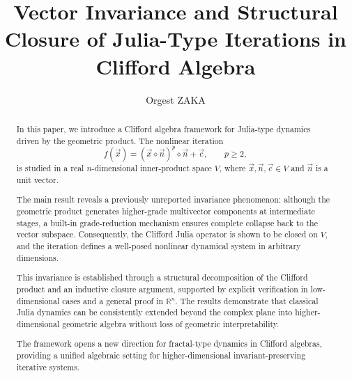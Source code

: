 \documentclass{amsart}
\theoremstyle{plain}
\numberwithin{equation}{section}
\begin{document}
\title[Clifford Julia Dynamics]
{Vector Invariance and Structural Closure of Julia-Type Iterations in Clifford Algebra}
\author{Orgest ZAKA}
\address{Department of Mathematics-Informatics, \\
Faculty of Economy and Agribusiness,\\
Agricultural University of Tirana, \\ Albania.\\
ORCID:  https://orcid.org/0000-0001-8431-8347}

\begin{abstract}
In this paper, we introduce a Clifford algebra framework for Julia-type
dynamics driven by the geometric product. The nonlinear iteration
\[
f(\vec{x}) = (\vec{x}\diamond \vec{n})^p \diamond \vec{n} + \vec{c},
\qquad p \ge 2,
\]
is studied in a real $n$-dimensional inner-product space $V$, where
$\vec{x}, \vec{n}, \vec{c} \in V$ and $\vec{n}$ is a unit vector.

The main result reveals a previously unreported invariance phenomenon:
although the geometric product generates higher-grade multivector
components at intermediate stages, a built-in grade-reduction mechanism
ensures complete collapse back to the vector subspace. Consequently, the
Clifford Julia operator is shown to be closed on $V$, and the iteration
defines a well-posed nonlinear dynamical system in arbitrary dimensions.

This invariance is established through a structural decomposition of the
Clifford product and an inductive closure argument, supported by explicit
verification in low-dimensional cases and a general proof in
$\mathbb{R}^n$. The results demonstrate that classical Julia dynamics can
be consistently extended beyond the complex plane into higher-dimensional
geometric algebra without loss of geometric interpretability.

The framework opens a new direction for fractal-type dynamics in
Clifford algebras, providing a unified algebraic setting for
higher-dimensional invariant-preserving iterative systems.
\end{abstract}

\maketitle
\end{document}
